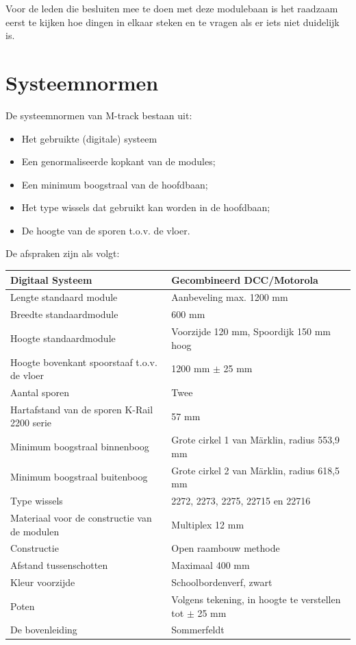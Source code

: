 \documentclass[12pt,a4paper]{report}
\newcommand*{\marklin}{M\"{a}rklin}
\begin{document}
Voor de leden die besluiten mee te doen met deze modulebaan is het raadzaam eerst te kijken hoe dingen in elkaar steken en te vragen als er iets niet duidelijk is.

\section{Systeemnormen}

De systeemnormen van M-track bestaan uit:
\begin{itemize}
\item Het gebruikte (digitale) systeem
\item Een genormaliseerde kopkant van de modules;
\item Een minimum boogstraal van de hoofdbaan;
\item Het type wissels dat gebruikt kan worden in de hoofdbaan;
\item De hoogte van de sporen t.o.v. de vloer.
\end{itemize}

De afspraken zijn als volgt:

\begin{tabular}{| l |p{7cm}|}
\hline
\cellcolor[gray]{0.84}Digitaal Systeem & Gecombineerd DCC/Motorola\\
\hline
\cellcolor[gray]{0.84}Lengte standaard module & Aanbeveling max. 1200 mm\\
\hline
\cellcolor[gray]{0.84}Breedte standaardmodule & 600 mm\\
\hline
\cellcolor[gray]{0.84}Hoogte standaardmodule & Voorzijde 120 mm, Spoordijk 150 mm hoog\\
\hline
\cellcolor[gray]{0.84}Hoogte bovenkant spoorstaaf t.o.v. de vloer&1200 mm $\pm$ 25 mm\\
\hline
\cellcolor[gray]{0.84}Aantal sporen&Twee\\
\hline
\cellcolor[gray]{0.84}Hartafstand van de sporen K-Rail 2200 serie&57 mm\\
\hline
\cellcolor[gray]{0.84}Minimum boogstraal binnenboog&Grote cirkel 1 van \marklin, radius 553,9 mm\\
\hline
\cellcolor[gray]{0.84}Minimum boogstraal buitenboog&Grote cirkel 2 van \marklin, radius 618,5 mm\\
\hline
\cellcolor[gray]{0.84}Type wissels&2272, 2273, 2275, 22715 en 22716\\
\hline
\cellcolor[gray]{0.84}Materiaal voor de constructie van de modulen&Multiplex 12 mm\\
\hline
\cellcolor[gray]{0.84}Constructie&Open raambouw methode\\
\hline
\cellcolor[gray]{0.84}Afstand tussenschotten&Maximaal 400 mm\\
\hline
\cellcolor[gray]{0.84}Kleur voorzijde&Schoolbordenverf, zwart\\
\hline
\cellcolor[gray]{0.84}Poten&Volgens tekening, in hoogte te verstellen tot $\pm$ 25 mm\\
\hline
\cellcolor[gray]{0.84}De bovenleiding&Sommerfeldt\\
\hline
\end{tabular}
\end{document}
